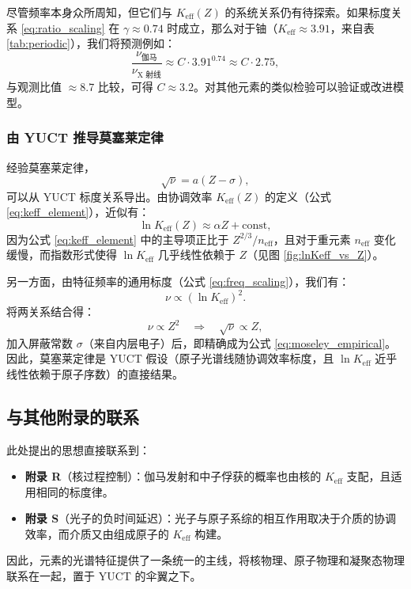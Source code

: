 \documentclass[11pt,a4paper]{article}
\begin{document}
	尽管频率本身众所周知，但它们与 \(K_{\mathrm{eff}}(Z)\) 的系统关系仍有待探索。如果标度关系 \eqref{eq:ratio_scaling} 在 \(\gamma \approx 0.74\) 时成立，那么对于铀（\(K_{\mathrm{eff}}\approx 3.91\)，来自表 \ref{tab:periodic}），我们将预测例如：
	\[
	\frac{\nu_{\text{伽马}}}{\nu_{\text{X 射线}}} \approx C \cdot 3.91^{0.74} \approx C \cdot 2.75,
	\]
	与观测比值 \(\approx 8.7\) 比较，可得 \(C \approx 3.2\)。对其他元素的类似检验可以验证或改进模型。
	
	\subsubsection{由 YUCT 推导莫塞莱定律}
	\label{sec:moseley_derivation}
	
	经验莫塞莱定律，
	\begin{equation}
		\sqrt{\nu} = a (Z - \sigma),
		\label{eq:moseley_empirical}
	\end{equation}
	可以从 YUCT 标度关系导出。由协调效率 \(K_{\mathrm{eff}}(Z)\) 的定义（公式 \ref{eq:keff_element}），近似有：
	\[
	\ln K_{\mathrm{eff}}(Z) \approx \alpha Z + \text{const},
	\]
	因为公式 \ref{eq:keff_element} 中的主导项正比于 \(Z^{2/3}/n_{\mathrm{eff}}\)，且对于重元素 \(n_{\mathrm{eff}}\) 变化缓慢，而指数形式使得 \(\ln K_{\mathrm{eff}}\) 几乎线性依赖于 \(Z\)（见图 \ref{fig:lnKeff_vs_Z}）。
	
	另一方面，由特征频率的通用标度（公式 \ref{eq:freq_scaling}），我们有：
	\[
	\nu \propto (\ln K_{\mathrm{eff}})^2.
	\]
	将两关系结合得：
	\[
	\nu \propto Z^2 \quad \Longrightarrow \quad \sqrt{\nu} \propto Z,
	\]
	加入屏蔽常数 \(\sigma\)（来自内层电子）后，即精确成为公式 \ref{eq:moseley_empirical}。因此，莫塞莱定律是 YUCT 假设（原子光谱线随协调效率标度，且 \(\ln K_{\mathrm{eff}}\) 近乎线性依赖于原子序数）的直接结果。
	
	\subsection{与其他附录的联系}
	
	此处提出的思想直接联系到：
	\begin{itemize}
		\item \textbf{附录 R}（核过程控制）：伽马发射和中子俘获的概率也由核的 \(K_{\mathrm{eff}}\) 支配，且适用相同的标度律。
		\item \textbf{附录 S}（光子的负时间延迟）：光子与原子系综的相互作用取决于介质的协调效率，而介质又由组成原子的 \(K_{\mathrm{eff}}\) 构建。
	\end{itemize}
	因此，元素的光谱特征提供了一条统一的主线，将核物理、原子物理和凝聚态物理联系在一起，置于 YUCT 的伞翼之下。
	
\end{document}
